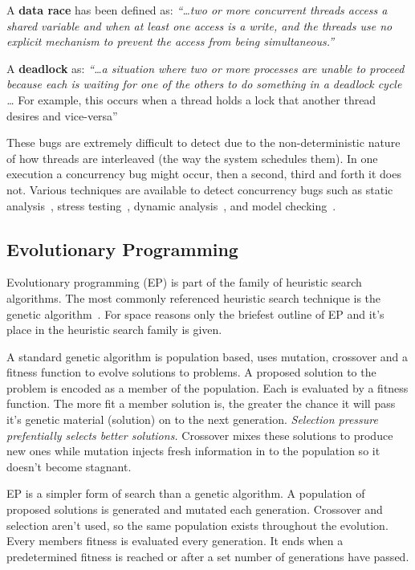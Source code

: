\documentclass[10pt, conference, compsocconf]{IEEEtran}
\begin{document}
A \textbf{data race} has been defined as: \textit{``\ldots two or more
concurrent threads access a shared variable and when at least one access is a
write, and the threads use no explicit mechanism to prevent the access from
being simultaneous.''}~\cite{LSW07}

A \textbf{deadlock} as: \textit{``\ldots a situation where two or more
processes are unable to proceed because each is waiting for one of the others
to do something in a deadlock cycle \ldots} For example, this occurs when a
thread holds a lock that another thread desires and vice-versa''~\cite{LSW07}

These bugs are extremely difficult to detect due to the non-deterministic
nature of how threads are interleaved (the way the system schedules them). In
one execution a concurrency bug might occur, then a second, third and forth it
does not. Various techniques are available to detect concurrency bugs
such as static analysis~\cite{NA07,NPSG09,HP04}, stress testing~\cite{HSU03},
dynamic analysis~\cite{JNPS09,EFN+02}, and model
checking~\cite{BHPV00,RDH03,OM03,MQB07,Holz97,JM04,HP00}.

\subsection{Evolutionary Programming}
\label{sec:evolutionary_programming}

Evolutionary programming (EP) is part of the family of heuristic search
algorithms. The most commonly referenced heuristic search technique is the
genetic algorithm~\cite{GA92}. For space reasons only the briefest outline of
EP and it's place in the heuristic search family is given.

A standard genetic algorithm is population based, uses mutation, crossover
and a fitness function to evolve solutions to problems. A proposed solution to
the problem is encoded as a member of the population. Each is evaluated by a
fitness function. The more fit a member solution is, the greater the chance
it will pass it's genetic material (solution) on to the next generation.
\textit{Selection pressure prefentially selects better solutions.} Crossover
mixes these solutions to produce new ones while mutation injects fresh
information in to the population so it doesn't become stagnant.

EP is a simpler form of search than a genetic algorithm. A population of
proposed solutions is generated and mutated each generation.  Crossover and
selection aren't used, so the same population exists throughout the evolution.
Every members fitness is evaluated every generation. It ends when a
predetermined fitness is reached or after a set number of generations have
passed.
\end{document}
